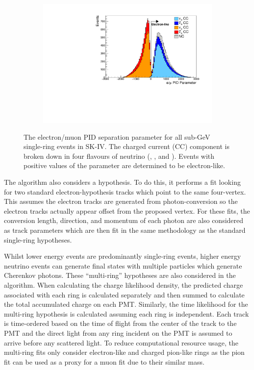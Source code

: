 \begin{figure}[h]
  \begin{subfigure}[t]{0.9\textwidth}
    \includegraphics[width=\textwidth, trim={0mm 0mm 0mm 0mm}, clip, page=1]{Figures/Simulations/PIDParameter.pdf}
  \end{subfigure}
  \caption{The electron/muon PID separation parameter for all sub-GeV single-ring events in SK-IV. The charged current (CC) component is broken down in four flavours of neutrino (\quickmath{\nu_{\mu}}, \quickmath{\bar{\nu}_{\mu}},  and ). Events with positive values of the parameter are determined to be electron-like.}
  \label{fig:Simulations_EMUPIDParamDistribution}
\end{figure}

The \fq algorithm also considers a  hypothesis. To do this, it performs a fit looking for two standard electron-hypothesis tracks which point to the same four-vertex. This assumes the electron tracks are generated from photon-conversion so the electron tracks actually appear offset from the proposed  vertex. For these fits, the conversion length, direction, and momentum of each photon are also considered as track parameters which are then fit in the same methodology as the standard single-ring hypotheses. 

Whilst lower energy events are predominantly single-ring events, higher energy neutrino events can generate final states with multiple particles which generate Cherenkov photons. These ``multi-ring'' hypotheses are also considered in the \fq algorithm. When calculating the charge likelihood density, the predicted charge associated with each ring is calculated separately and then summed to calculate the total accumulated charge on each PMT. Similarly, the time likelihood for the multi-ring hypothesis is calculated assuming each ring is independent. Each track is time-ordered based on the time of flight from the center of the track to the PMT and the direct light from any ring incident on the PMT is assumed to arrive before any scattered light. To reduce computational resource usage, the multi-ring fits only consider electron-like and charged pion-like rings as the pion fit can be used as a proxy for a muon fit due to their similar mass.

